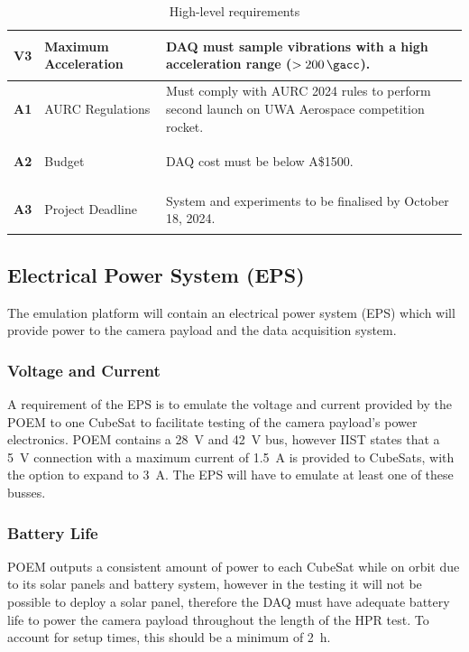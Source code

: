 \documentclass{report}
\newcommand{\aud}{A\$}
\begin{document}
\begin{table}[h!]
\begin{tabular}{|l|L{0.25\textwidth}|L{0.6\textwidth}|}
    \hypertarget{req-V3}{\textbf{V3}} & Maximum Acceleration           & DAQ must sample vibrations with a high acceleration range ($>\SI{200}{\gacc}$).                     \\ \hline
    \hypertarget{req-A1}{\textbf{A1}} & AURC Regulations               & Must comply with AURC 2024 rules to perform second launch on UWA Aerospace competition rocket.      \\ \hline
    \hypertarget{req-A2}{\textbf{A2}} & Budget                         & DAQ cost must be below \aud 1500.                                                                   \\ \hline
    \hypertarget{req-A3}{\textbf{A3}} & Project Deadline               & System and experiments to be finalised by October 18, 2024.                                         \\ \hline
  \end{tabular}
  \caption{High-level requirements}
  \label{tabl:high-level-requirements}
\end{table}


\subsection{Electrical Power System (EPS)}
The emulation platform will contain an electrical power system (EPS) which will provide power to the camera payload and the data acquisition system.

\subsubsection{Voltage and Current}
A requirement of the EPS is to emulate the voltage and current provided by the POEM to one CubeSat to facilitate testing of the camera payload's power electronics. POEM contains a \SI{28}{\volt} and \SI{42}{\volt} bus, however IIST states that a \SI{5}{\volt} connection with a maximum current of \SI{1.5}{\ampere} is provided to CubeSats, with the option to expand to \SI{3}{\ampere}. The EPS will have to emulate at least one of these busses.

\subsubsection{Battery Life}
POEM outputs a consistent amount of power to each CubeSat while on orbit due to its solar panels and battery system, however in the testing it will not be possible to deploy a solar panel, therefore the DAQ must have adequate battery life to power the camera payload throughout the length of the HPR test. To account for setup times, this should be a minimum of \SI{2}{\hour}.
\end{document}
